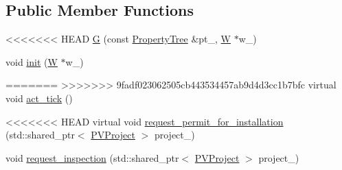\subsection*{Public Member Functions}
{\bf }\par
\begin{DoxyCompactItemize}
\item 
<<<<<<< HEAD
\hyperlink{classsolar__core_1_1_g_a624adac31ade604e0335717bad4fc9cd}{G} (const \hyperlink{namespacesolar__core_adeda2737d6938c190eb774a5b2495045}{Property\+Tree} \&pt\+\_\+, \hyperlink{classsolar__core_1_1_w}{W} $\ast$w\+\_\+)
\item 
void \hyperlink{classsolar__core_1_1_g_a0734da633e88ea0f6ff782d4b6521c09}{init} (\hyperlink{classsolar__core_1_1_w}{W} $\ast$w\+\_\+)
\item 
=======
>>>>>>> 9fadf023062505cb443534457ab9d4d3cc1b7bfc
virtual void \hyperlink{classsolar__core_1_1_g_ad3c9fb1da4db51b296c29a6b94b0f139}{act\+\_\+tick} ()
\end{DoxyCompactItemize}

{\bf }\par
\begin{DoxyCompactItemize}
\item 
<<<<<<< HEAD
virtual void \hyperlink{classsolar__core_1_1_g_a615600f35d73a38ea48e99909fff5085}{request\+\_\+permit\+\_\+for\+\_\+installation} (std\+::shared\+\_\+ptr$<$ \hyperlink{classsolar__core_1_1_p_v_project}{P\+V\+Project} $>$ project\+\_\+)
\item 
void \hyperlink{classsolar__core_1_1_g_ae5836aff26a74e47cd26081fb94641bb}{request\+\_\+inspection} (std\+::shared\+\_\+ptr$<$ \hyperlink{classsolar__core_1_1_p_v_project}{P\+V\+Project} $>$ project\+\_\+)
\end{DoxyCompactItemize}

